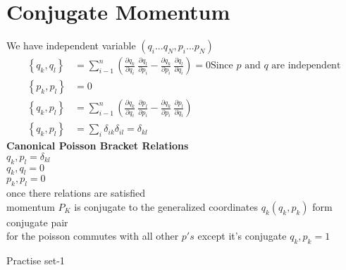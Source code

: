 \section{Conjugate Momentum}
We have independent variable $(q_i...q_N,p_i...p_N)$
\begin{align*}
\left\lbrace q_k,q_l\right\rbrace &=\sum\limits_{i-1}^{n}\left(\frac{\partial q_k}{\partial q_i}\ \frac{\partial q_l}{\partial p_i}-\frac{\partial q_k}{\partial p_i}\ \frac{\partial q_l}{\partial q_i}\right)=0 \text{Since $p$ and $q$ are independent}\\
\left\lbrace p_k,p_l\right\rbrace  &=0  \\
\left\lbrace q_k,p_l\right\rbrace  &=\sum\limits_{i-1}^{n}\left(\frac{\partial q_k}{\partial q_i}\ \frac{\partial p_l}{\partial p_i}-\frac{\partial q_k}{\partial p_i}\ \frac{\partial p_l}{\partial q_i}\right)\\
\left\lbrace q_k,p_l\right\rbrace  &=\sum\limits_{i}\delta_{ik}\delta_{il}=\delta_{kl}
\end{align*}
\textbf{Canonical Poisson Bracket Relations}\\
${q_k,p_l}=\delta_{kl}$\\
${q_k,q_l}=0$\\
${p_k,p_l}=0$\\
once there relations are satisfied\\
momentum $P_K$ is conjugate to the generalized coordinates $q_k (q_k,p_k)$ form conjugate pair\\
for the poisson commutes with all other $p's$ except it's conjugate ${q_k,p_k}=1$
\newpage
\begin{abox}
	Practise set-1
\end{abox}
